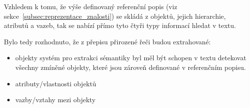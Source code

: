 Vzhledem k tomu, že výše definovaný referenční popis (viz sekce~\ref{subsec:reprezentace_znalosti}) se skládá z objektů, jejich hierarchie, atributů a vazeb,
tak se nabízí přímo tyto čtyři typy informací hledat v textu.

Bylo tedy rozhodnuto, že z přepisu přirozené řeči budou extrahované:
\begin{itemize}
	\item objekty \to systém pro extrakci sémantiky byl měl být schopen v textu detekovat všechny zmíněné objekty, které jsou zároveň definované v referenčním popisu.
	\item atributy/vlastnosti objektů
	\item vazby/vztahy mezi objekty
\end{itemize}
